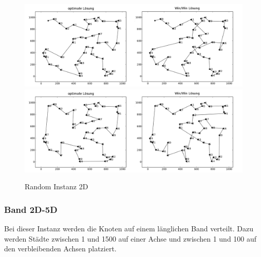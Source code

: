 \documentclass[11pt,a4paper]{article}
\begin{document}
\begin{figure}[H]
    \centering
    \includegraphics[width=16cm]{gfx/random_hpp_comparison}
    \includegraphics[width=16cm]{gfx/random_tsp_comparison}
    \caption{Random Instanz 2D}
    \label{img:random_comparison}
\end{figure}

\subsubsection{Band 2D-5D}
Bei dieser Instanz werden die Knoten auf einem länglichen Band verteilt. Dazu werden Städte zwischen 1 und 1500 auf einer Achse und zwischen 1 und 100 auf den verbleibenden Achsen platziert.
\end{document}
